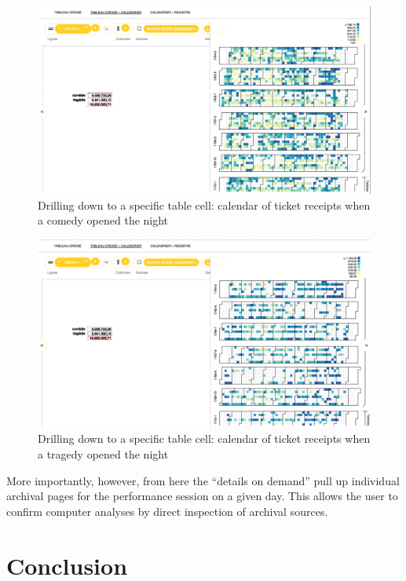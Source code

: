 \documentclass[	DIV=calc,%
							paper=a4,%
							fontsize=11pt,%
							twocolumn]{scrartcl}	 					%
\begin{document}
\begin{figure}
  \centering
	\includegraphics[width=7in]{steps/comedies-calendar.png}
	\caption{Drilling down to a specific table cell: calendar of ticket receipts when a comedy opened the night}
	\label{fig:comedies-calendar}
\end{figure}

\begin{figure}
  \centering
	\includegraphics[width=7in]{steps/tragedies-calendar.png}
	\caption{Drilling down to a specific table cell: calendar of ticket receipts when a tragedy opened the night}
	\label{fig:tragedies-calendar}
\end{figure}

More importantly, however, from here the ``details on demand'' pull up individual archival pages for the performance session on a given day.  This allows the user to confirm computer analyses by direct inspection of archival sources.

\section*{Conclusion}
\end{document}
